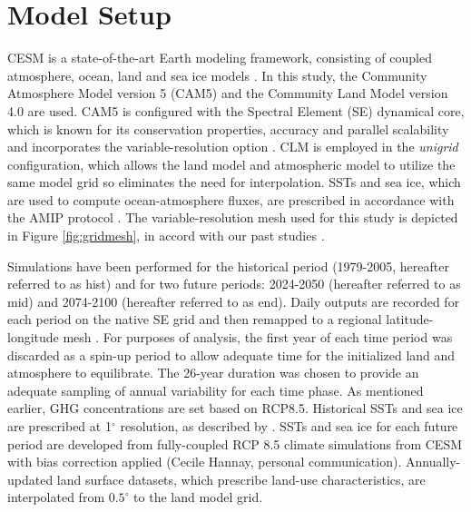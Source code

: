 \documentclass{ametsoc}
\begin{document}
\section{Model Setup} \label{sec:ModelSetup}

CESM is a state-of-the-art Earth modeling framework, consisting of coupled atmosphere, ocean, land and sea ice models \citep{CAM5Tech, hurrell2013community}. In this study, the Community Atmosphere Model version 5 (CAM5) \citep{CAM5Tech} and the Community Land Model version 4.0 \citep{CLM40Tech} are used.  CAM5 is configured with the Spectral Element (SE) dynamical core, which is known for its conservation properties, accuracy and parallel scalability \citep{dennis2011cam, taylor2011conservation} and incorporates the variable-resolution option \citep{zarzycki2014using}.  CLM is employed in the \textit{unigrid} configuration, which allows the land model and atmospheric model to utilize the same model grid so eliminates the need for interpolation.  SSTs and sea ice, which are used to compute ocean-atmosphere fluxes, are prescribed in accordance with the AMIP protocol \citep{Gates1992}. The variable-resolution mesh used for this study is depicted in Figure \ref{fig:gridmesh}, in accord with our past studies \citep{rhoades2015characterizing, huang2016evaluation, huang2016irrigation, rhoades2016projecting}.


Simulations have been performed for the historical period (1979-2005, hereafter referred to as \textsf{hist}) and for two future periods: 2024-2050 (hereafter referred to as \textsf{mid}) and 2074-2100 (hereafter referred to as \textsf{end}).  Daily outputs are recorded for each period on the native SE grid and then remapped to a regional latitude-longitude mesh \citep{ullrich2015arbitrary,ullrich2016arbitrary}.  For purposes of analysis, the first year of each time period was discarded as a spin-up period to allow adequate time for the initialized land and atmosphere to equilibrate. The 26-year duration was chosen to provide an adequate sampling of annual variability for each time phase. As mentioned earlier, GHG concentrations are set based on RCP8.5. Historical SSTs and sea ice are prescribed at 1$^\circ$ resolution, as described by \citet{hurrell2008new}. SSTs and sea ice for each future period are developed from fully-coupled RCP 8.5 climate simulations from CESM with bias correction applied  (Cecile Hannay, personal communication).  Annually-updated land surface datasets, which prescribe land-use characteristics, are interpolated from $0.5^\circ$ to the land model grid.
\end{document}
